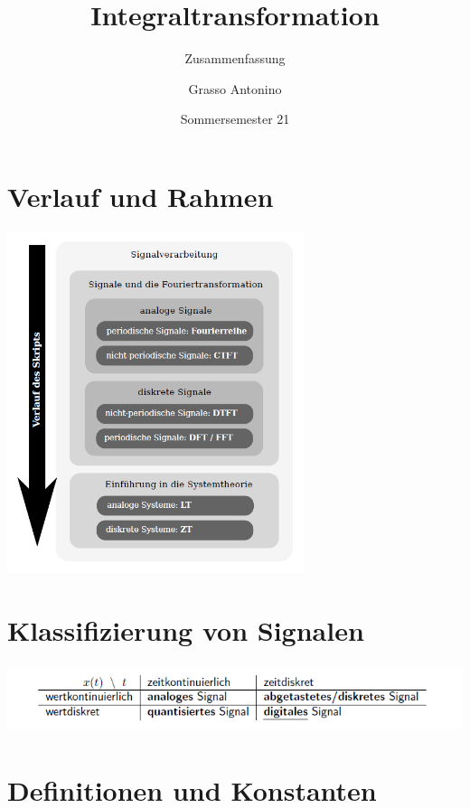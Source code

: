 \documentclass[12pt,a4paper]{scrartcl}
\title{Integraltransformation}
\subtitle{Zusammenfassung}
\author{Grasso Antonino}
\date{Sommersemester 21}
\begin{document}
\begin{titlepage}
\maketitle
\vspace{100px}

\end{titlepage}

\tableofcontents
\newpage


\section{Verlauf und Rahmen}
\label{sec:verlauf-und-rahmen}
\includegraphics[height=10cm]{Pictures/Verlauf.png}

\section{Klassifizierung von Signalen}
\label{sec:klassifizierung}
\includegraphics[height=2cm]{Pictures/Einheiten.png}

\section{Definitionen und Konstanten}
\label{sec:definitionen-und-konstanten}
\end{document}
